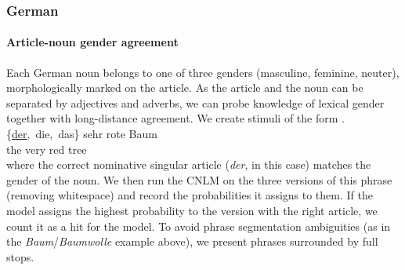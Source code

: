 \subsubsection{German}%


\paragraph{Article-noun  gender agreement}
Each German noun belongs to one of three genders (masculine, feminine, neuter), morphologically marked on the article. As the article and the noun can be separated by adjectives and adverbs, we can probe knowledge of lexical gender together with long-distance agreement.
We create stimuli of the form
\exg. \{\underline{der},\ die,\ das\} sehr rote Baum \\
the very red tree \label{ex:german-gender}\\

where the correct nominative singular article (\emph{der}, in this
case) matches the gender of the noun.  We then run the CNLM on the
three versions of this phrase (removing whitespace) and record the
probabilities it assigns to them. If the model assigns the highest
probability to the version with the right article, we count it as a
hit for the model. To avoid phrase segmentation ambiguities (as in the
\emph{Baum}/\emph{Baumwolle} example above), we present phrases
surrounded by full stops.

